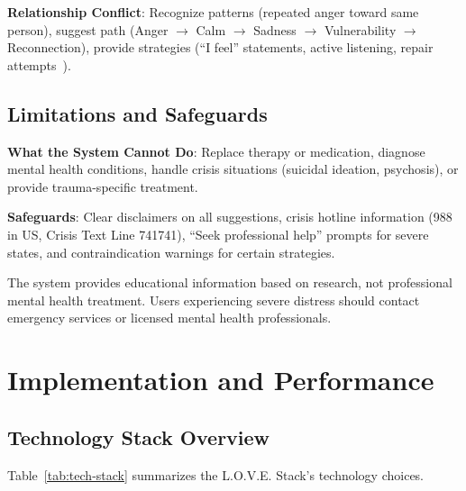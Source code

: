 \documentclass[10pt,twocolumn]{article}
\begin{document}
\textbf{Relationship Conflict}: Recognize patterns (repeated anger toward same person), suggest path (Anger $\rightarrow$ Calm $\rightarrow$ Sadness $\rightarrow$ Vulnerability $\rightarrow$ Reconnection), provide strategies (``I feel'' statements, active listening, repair attempts~\cite{gottman2015}).

\subsection{Limitations and Safeguards}

\textbf{What the System Cannot Do}: Replace therapy or medication, diagnose mental health conditions, handle crisis situations (suicidal ideation, psychosis), or provide trauma-specific treatment.

\textbf{Safeguards}: Clear disclaimers on all suggestions, crisis hotline information (988 in US, Crisis Text Line 741741), ``Seek professional help'' prompts for severe states, and contraindication warnings for certain strategies.

The system provides educational information based on research, not professional mental health treatment. Users experiencing severe distress should contact emergency services or licensed mental health professionals.

\section{Implementation and Performance}
\label{sec:implementation}
\subsection{Technology Stack Overview}

Table~\ref{tab:tech-stack} summarizes the L.O.V.E. Stack's technology choices.
\end{document}
